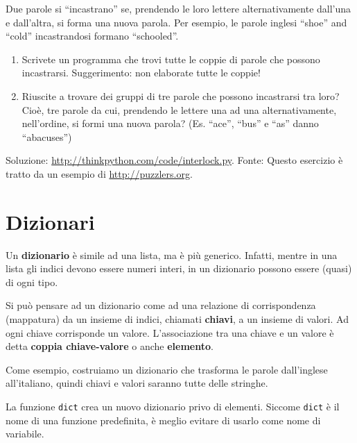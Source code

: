 \documentclass[10pt]{book}
\begin{document}
\vspace{0.2in}
\begin{exercise}

Due parole si ``incastrano'' se, prendendo le loro lettere alternativamente  dall'una e dall'altra, si forma una nuova parola. Per esempio, le parole inglesi ``shoe'' and ``cold'' incastrandosi formano ``schooled''.


\begin{enumerate}

\item Scrivete un programma che trovi tutte le coppie di parole che possono incastrarsi. Suggerimento: non elaborate tutte le coppie!

\item Riuscite a trovare dei gruppi di tre parole che possono incastrarsi tra loro? Cioè, tre parole da cui, prendendo le lettere una ad una alternativamente, nell'ordine, si formi una nuova parola? (Es. ``ace'', ``bus'' e ``as'' danno ``abacuses'')

\end{enumerate}

Soluzione: \url{http://thinkpython.com/code/interlock.py}.
Fonte: Questo esercizio è tratto da un esempio di  \url{http://puzzlers.org}.
\end{exercise}


\chapter{Dizionari}

Un {\bf dizionario} è simile ad una lista, ma è più generico. Infatti, mentre in una lista gli indici devono essere numeri interi, in un dizionario possono essere (quasi) di ogni tipo.

Si può pensare ad un dizionario come ad una relazione di corrispondenza (mappatura) da un insieme di indici, chiamati {\bf chiavi}, a un insieme di valori. Ad ogni chiave corrisponde un valore. L'associazione tra una chiave e un valore è detta {\bf coppia chiave-valore} o anche {\bf elemento}.

Come esempio, costruiamo un dizionario che trasforma le parole dall'inglese all'italiano, quindi chiavi e valori saranno tutte delle stringhe.

La funzione {\tt dict} crea un nuovo dizionario privo di elementi. Siccome {\tt dict} è il nome di una funzione predefinita, è meglio evitare di usarlo come nome di variabile.
\end{document}
